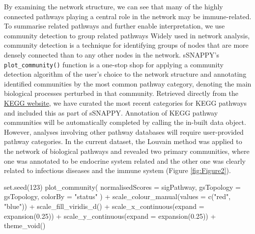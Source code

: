 \documentclass[9pt,a4paper,]{extarticle}
\newenvironment{Shaded}{\begin{snugshade}}{\end{snugshade}}
\newcommand{\AttributeTok}[1]{\textcolor[rgb]{0.77,0.63,0.00}{#1}}
\newcommand{\DecValTok}[1]{\textcolor[rgb]{0.00,0.00,0.81}{#1}}
\newcommand{\FloatTok}[1]{\textcolor[rgb]{0.00,0.00,0.81}{#1}}
\newcommand{\FunctionTok}[1]{\textcolor[rgb]{0.00,0.00,0.00}{#1}}
\newcommand{\NormalTok}[1]{#1}
\newcommand{\SpecialCharTok}[1]{\textcolor[rgb]{0.00,0.00,0.00}{#1}}
\newcommand{\StringTok}[1]{\textcolor[rgb]{0.31,0.60,0.02}{#1}}
\begin{document}
By examining the network structure, we can see that many of the highly connected pathways playing a central role in the network may be immune-related.
To summarise related pathways and further enable interpretation, we use community detection to group related pathways
Widely used in network analysis, community detection is a technique for identifying groups of nodes that are more densely connected than to any other nodes in the network\citep{Newman2004}.
sSNAPPY's \texttt{plot\_community()} function is a one-stop shop for applying a community detection algorithm of the user's choice to the network structure and annotating identified communities by the most common pathway category, denoting the main biological processes perturbed in that community.
Retrieved directly from the \href{https://www.genome.jp/kegg/pathway.html}{KEGG website}, we have curated the most recent categories for KEGG pathways and included this as part of sSNAPPY.
Annotation of KEGG pathway communities will be automatically completed by calling the in-built data object.
However, analyses involving other pathway databases will require user-provided pathway categories.
In the current dataset, the Louvain method was applied to the network of biological pathways and revealed two primary communities, where one was annotated to be endocrine system related and the other one was clearly related to infectious diseases and the immune system (Figure \ref{fig:Figure2}).

\begin{Shaded}
\begin{Highlighting}[]
\FunctionTok{set.seed}\NormalTok{(}\DecValTok{123}\NormalTok{)}
\FunctionTok{plot\_community}\NormalTok{(}
  \AttributeTok{normalisedScores =}\NormalTok{ sigPathway,}
  \AttributeTok{gsTopology =}\NormalTok{ gsTopology, }
  \AttributeTok{colorBy =} \StringTok{"status"}
\NormalTok{) }\SpecialCharTok{+}
  \FunctionTok{scale\_colour\_manual}\NormalTok{(}\AttributeTok{values =} \FunctionTok{c}\NormalTok{(}\StringTok{"red"}\NormalTok{, }\StringTok{"blue"}\NormalTok{)) }\SpecialCharTok{+}
  \FunctionTok{scale\_fill\_viridis\_d}\NormalTok{() }\SpecialCharTok{+}
  \FunctionTok{scale\_x\_continuous}\NormalTok{(}\AttributeTok{expand =} \FunctionTok{expansion}\NormalTok{(}\FloatTok{0.25}\NormalTok{)) }\SpecialCharTok{+}
  \FunctionTok{scale\_y\_continuous}\NormalTok{(}\AttributeTok{expand =} \FunctionTok{expansion}\NormalTok{(}\FloatTok{0.25}\NormalTok{)) }\SpecialCharTok{+}
  \FunctionTok{theme\_void}\NormalTok{() }
\end{Highlighting}
\end{Shaded}
\end{document}
